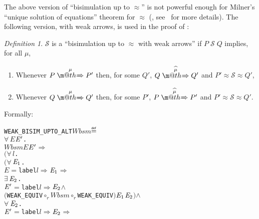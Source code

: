 \documentclass[GCNS]{yincog}
\makeatletter
\renewcommand{\HOLConst}[1]{\texttt{#1}}
\renewcommand{\HOLBoundVar}[1]{\ensuremath{\mathit{#1}}}
\renewcommand{\HOLFreeVar}[1]{\ensuremath{\mathit{#1}}}
\renewcommand{\HOLSymConst}[1]{#1}
\renewcommand{\HOLTokenConj}{\ensuremath{\wedge}}
\renewcommand{\HOLTokenRCompose}{\ensuremath{\circ _r}}
\def \rightarrowfillWEAK{$\m@th\mathord{\smash=}\mkern-6mu%
  \cleaders\hbox{$\mkern-2mu\mathord{\smash=}\mkern-2mu$}\hfill
  \mkern-6mu\mathord\Rightarrow$}
\renewcommand{\HOLTokenDefEquality}{\ensuremath{\mathrel{\overset{\makebox [0pt]{\text{\tiny \textsf{def}}}}{=}}}}
\renewcommand{\HOLTokenExists}{\ensuremath{\exists \,}}
\renewcommand{\HOLTokenForall}{\ensuremath{\forall \,}}
\theoremstyle{remark}
\newtheorem{definition}{Definition}[section]
\theoremstyle{theorem}
\theoremstyle{remark}
\newcommand{\HOLTokenWeakTransBegin}{$=$}
\newcommand{\HOLTokenWeakTransEnd}{$\Rightarrow$\xspace}
\renewcommand{\HOLTokenImp}{\ensuremath{\Longrightarrow}}
\newcommand{\Arr}[1]{\mathrel{\stackrel{{\;\;#1\;\;}}{\mbox{\rightarrowfillWEAK}}}}
\newcommand{\Arcap}[1]{\mathrel{\stackrel{{\;\;{\widehat{#1}}\;\;}}{\mbox{\rightarrowfillWEAK}}}}
\def\Svtex{\mathcal{S}}
\newcommand{\wbvtex}{\approx}
\makeatother
\begin{document}
The above version of ``bisimulation up to $\wbvtex $'' is not powerful
enough for Milner's ``unique solution of equations'' theorem for
$\wbvtex $ (, see~\cite{sangiorgi1992problem} for
more details). The following version, with weak arrows, is used in the
proof of :
%
\begin{definition}%
 \label{def:doubleweak}
$\mathcal{S}$ is a ``bisimulation up to $\approx $ with weak arrows'' if
$P \; \mathcal{S} \; Q$ implies, for all $\mu $,
%
\begin{enumerate}
%
\item Whenever $P \Arr{\mu} P'$ then, for some $Q'$,
$Q \Arcap{\mu} Q'$ and $P' \wbvtex \Svtex \wbvtex Q'$,
%
\item Whenever $Q \Arr{\mu} Q'$ then, for some $P'$,
$P \Arcap{\mu} P'$ and $P' \wbvtex \Svtex \wbvtex Q'$.
%
\end{enumerate}
%
Formally:
%
\begin{alltt}
   \HOLConst{WEAK\_BISIM\_UPTO\_ALT} \HOLFreeVar{Wbsm} \HOLTokenDefEquality{}
     \HOLSymConst{\HOLTokenForall{}}\HOLBoundVar{E} \ensuremath{\HOLBoundVar{E}\sp{\prime}}.
         \HOLFreeVar{Wbsm} \HOLBoundVar{E} \ensuremath{\HOLBoundVar{E}\sp{\prime}} \HOLSymConst{\HOLTokenImp{}}
         \ensuremath{(}\HOLSymConst{\HOLTokenForall{}}\HOLBoundVar{l}.
              \ensuremath{(}\HOLSymConst{\HOLTokenForall{}}\ensuremath{\HOLBoundVar{E}\sb{\mathrm{1}}}.
                   \HOLBoundVar{E} \HOLTokenWeakTransBegin\HOLConst{label} \HOLBoundVar{l}\HOLTokenWeakTransEnd \ensuremath{\HOLBoundVar{E}\sb{\mathrm{1}}} \HOLSymConst{\HOLTokenImp{}}
                   \HOLSymConst{\HOLTokenExists{}}\ensuremath{\HOLBoundVar{E}\sb{\mathrm{2}}}.
                       \ensuremath{\HOLBoundVar{E}\sp{\prime}} \HOLTokenWeakTransBegin\HOLConst{label} \HOLBoundVar{l}\HOLTokenWeakTransEnd \ensuremath{\HOLBoundVar{E}\sb{\mathrm{2}}} \HOLSymConst{\HOLTokenConj{}}
                       \ensuremath{(}\HOLConst{WEAK\_EQUIV} \HOLSymConst{\HOLTokenRCompose{}} \HOLFreeVar{Wbsm} \HOLSymConst{\HOLTokenRCompose{}} \HOLConst{WEAK\_EQUIV}\ensuremath{)} \ensuremath{\HOLBoundVar{E}\sb{\mathrm{1}}} \ensuremath{\HOLBoundVar{E}\sb{\mathrm{2}}}\ensuremath{)} \HOLSymConst{\HOLTokenConj{}}
              \HOLSymConst{\HOLTokenForall{}}\ensuremath{\HOLBoundVar{E}\sb{\mathrm{2}}}.
                  \ensuremath{\HOLBoundVar{E}\sp{\prime}} \HOLTokenWeakTransBegin\HOLConst{label} \HOLBoundVar{l}\HOLTokenWeakTransEnd \ensuremath{\HOLBoundVar{E}\sb{\mathrm{2}}} \HOLSymConst{\HOLTokenImp{}}

\end{alltt}
\end{definition}
\end{document}
